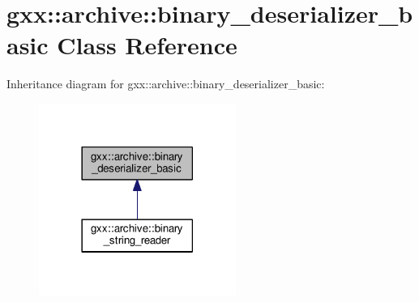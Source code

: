 \hypertarget{classgxx_1_1archive_1_1binary__deserializer__basic}{}\section{gxx\+:\+:archive\+:\+:binary\+\_\+deserializer\+\_\+basic Class Reference}
\label{classgxx_1_1archive_1_1binary__deserializer__basic}


Inheritance diagram for gxx\+:\+:archive\+:\+:binary\+\_\+deserializer\+\_\+basic\+:
\nopagebreak
\begin{figure}[H]
\begin{center}
\leavevmode
\includegraphics[width=182pt]{classgxx_1_1archive_1_1binary__deserializer__basic__inherit__graph}
\end{center}
\end{figure}

